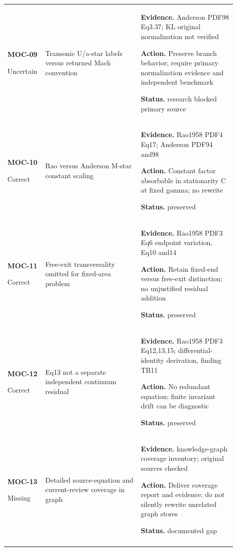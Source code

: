 \begin{longtable}{@{}P{0.12\linewidth}P{0.40\linewidth}P{0.40\linewidth}@{}}
\textbf{MOC-09}\par Uncertain & Transonic U/a-star labels versus returned Mach convention\par {} & \textbf{Evidence.} Anderson PDF98 Eq3.37; KL original normalization not verified\par \textbf{Action.} Preserve branch behavior; require primary normalization evidence and independent benchmark\par \textbf{Status.} research blocked primary source\\ \addlinespace[5pt]
\textbf{MOC-10}\par Correct & Rao versus Anderson M-star constant scaling\par {}\par {} & \textbf{Evidence.} Rao1958 PDF4 Eq17; Anderson PDF94 and98\par \textbf{Action.} Constant factor absorbable in stationarity C at fixed gamma; no rewrite\par \textbf{Status.} preserved\\ \addlinespace[5pt]
\textbf{MOC-11}\par Correct & Free-exit transversality omitted for fixed-area problem\par {} & \textbf{Evidence.} Rao1958 PDF3 Eq6 endpoint variation, Eq10 and14\par \textbf{Action.} Retain fixed-end versus free-exit distinction; no unjustified residual addition\par \textbf{Status.} preserved\\ \addlinespace[5pt]
\textbf{MOC-12}\par Correct & Eq13 not a separate independent continuum residual\par {} & \textbf{Evidence.} Rao1958 PDF3 Eq12,13,15; differential-identity derivation, finding TB11\par \textbf{Action.} No redundant equation; finite invariant drift can be diagnostic\par \textbf{Status.} preserved\\ \addlinespace[5pt]
\textbf{MOC-13}\par Missing & Detailed source-equation and current-review coverage in graph\par {}\par {}\par {} & \textbf{Evidence.} knowledge-graph coverage inventory; original sources checked\par \textbf{Action.} Deliver coverage report and evidence; do not silently rewrite unrelated graph stores\par \textbf{Status.} documented gap\\ \addlinespace[5pt]

\end{longtable}
